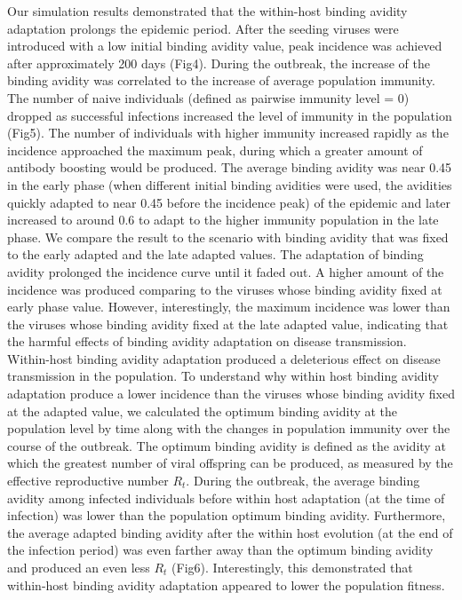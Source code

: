 \documentclass[12pt,a4paper]{article}
\begin{document}
Our simulation results demonstrated that the within-host binding avidity adaptation prolongs the epidemic period. After the seeding viruses were introduced with a low initial binding avidity value, peak incidence was achieved after approximately 200 days (Fig4). During the outbreak, the increase of the binding avidity was correlated to the increase of average population immunity. The number of naive individuals (defined as pairwise immunity level = 0) dropped as successful infections increased the level of immunity in the population (Fig5).  The number of individuals with higher immunity increased rapidly as the incidence approached the maximum peak, during which a greater amount of antibody boosting would be produced. The average binding avidity was near 0.45 in the early phase (when different initial binding avidities were used, the avidities quickly adapted to near 0.45 before the incidence peak) of the epidemic and later increased to around 0.6 to adapt to the higher immunity population in the late phase. We compare the result to the scenario with binding avidity that was fixed to the early adapted and the late adapted values. The adaptation of binding avidity prolonged the incidence curve until it faded out. A higher amount of the incidence was produced comparing to the viruses whose binding avidity fixed at early phase value. However, interestingly, the maximum incidence was lower than the viruses whose binding avidity fixed at the late adapted value, indicating that the harmful effects of binding avidity adaptation on disease transmission.  \\
Within-host binding avidity adaptation produced a deleterious effect on disease transmission in the population. To understand why within host binding avidity adaptation produce a lower incidence than the viruses whose binding avidity fixed at the adapted value, we calculated the optimum binding avidity at the population level by time along with the changes in population immunity over the course of the outbreak. The optimum binding avidity is defined as the avidity at which the greatest number of viral offspring can be produced, as measured by the effective reproductive number $R_{t}$. During the outbreak, the average binding avidity among infected individuals before within host adaptation (at the time of infection) was lower than the population optimum binding avidity. Furthermore, the average adapted binding avidity after the within host evolution (at the end of the infection period) was even farther away than the optimum binding avidity and produced an even less $R_{t}$ (Fig6). Interestingly, this demonstrated that within-host binding avidity adaptation appeared to lower the population fitness. \\
\end{document}
